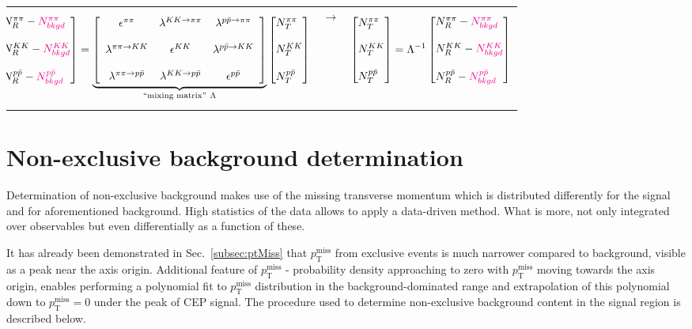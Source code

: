 \begin{tabulary}{\textwidth}{LCL}
\begin{equation}\label{eq:misidentificationMatrix}\hspace*{-15pt}
\Spvek{N^{\pi\pi}_{R}-\textcolor{magenta}{N^{\pi\pi}_{bkgd}};~;N^{KK}_{R}-\textcolor{magenta}{N^{KK}_{bkgd}};~;N^{p\bar{p}}_{R}-\textcolor{magenta}{N^{p\bar{p}}_{bkgd}}} =  \underbrace{\left[ \begin{array}{ccc}
\epsilon^{\pi\pi} & \lambda^{ KK\rightarrow \pi\pi} & \lambda^{p\bar{p} \rightarrow \pi\pi} \\
~ & ~ & ~\\
\lambda^{\pi\pi\rightarrow KK} & \epsilon^{KK} & \lambda^{ p\bar{p} \rightarrow KK}\\
~ & ~ & ~\\
\lambda^{\pi\pi\rightarrow p\bar{p}} & \lambda^{ KK\rightarrow p\bar{p}} & \epsilon^{p\bar{p}}
\end{array} \right]}_{\text{``mixing matrix''}~\Lambda}\Spvek{N^{\pi\pi}_{T};~;N^{KK}_{T};~;N^{p\bar{p}}_{T}}
\end{equation}&%
\vspace{40pt}$\rightarrow$\hspace{20pt}&
\begin{equation}\label{eq:pidUnfoldingMatrix}
\Spvek{N^{\pi\pi}_{T};~;N^{KK}_{T};~;N^{p\bar{p}}_{T}} = \Lambda^{-1}\Spvek{N^{\pi\pi}_{R}-\textcolor{magenta}{N^{\pi\pi}_{bkgd}};~;N^{KK}_{R}-\textcolor{magenta}{N^{KK}_{bkgd}};~;N^{p\bar{p}}_{R}-\textcolor{magenta}{N^{p\bar{p}}_{bkgd}}}
\end{equation}
\end{tabulary}

\section{Non-exclusive background determination}

Determination of non-exclusive background makes use of the missing transverse momentum which is distributed differently for the signal and for aforementioned background. High statistics of the data allows to apply a data-driven method. What is more, not only integrated over observables but even differentially as a function of these.

It has already been demonstrated in Sec.~\ref{subsec:ptMiss} that $p_{\text{T}}^{\text{miss}}$ from exclusive events is much narrower compared to background, visible as a peak near the axis origin. Additional feature of 
$p_{\text{T}}^{\text{miss}}$ - probability density approaching to zero with $p_{\text{T}}^{\text{miss}}$ moving towards the axis origin, enables performing a polynomial fit to $p_{\text{T}}^{\text{miss}}$ distribution in the background-dominated range and extrapolation of this polynomial down to  $p_{\text{T}}^{\text{miss}} = 0$ under the peak of CEP signal. The procedure used to determine non-exclusive background content in the signal region is described below.

